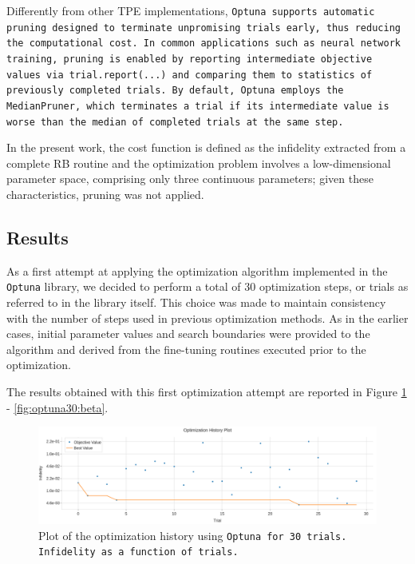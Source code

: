 Differently from other TPE implementations, \tt{Optuna} supports automatic pruning designed to terminate unpromising trials early, thus reducing the computational cost. 
In common applications such as neural network training, pruning is enabled by reporting intermediate objective values via \texttt{trial.report(...)} and comparing them to statistics of previously completed trials. 
By default, \texttt{Optuna} employs the \texttt{MedianPruner}, which terminates a trial if its intermediate value is worse than the median of completed trials at the same step.

In the present work, the cost function is defined as the infidelity extracted from a complete RB routine and the optimization problem involves a low-dimensional parameter space, comprising only three continuous parameters; given these characteristics, pruning was not applied.

\subsection{Results}

As a first attempt at applying the optimization algorithm implemented in the \texttt{Optuna} library, we decided to perform  a total of 30 optimization steps, or trials as referred to in the library itself. 
This choice was made to maintain consistency with the number of steps used in previous optimization methods. 
As in the earlier cases, initial parameter values and search boundaries were provided to the algorithm and derived from the fine-tuning routines executed prior to the optimization.

The results obtained with this first optimization attempt are reported in Figure \ref{fig:optuna30:optimization} - \ref{fig:optuna30:beta}.

\begin{figure}[h!]
    \centering
    \includegraphics[width=\textwidth]{figures/png/RB_optimization/Optuna/30/optimization.png}
    \caption{Plot of the optimization history using \tt{Optuna} for 30 trials. Infidelity as a function of trials.}
    \label{fig:optuna30:optimization}
\end{figure}

